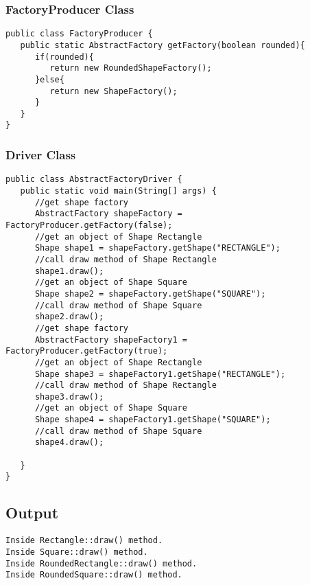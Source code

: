 \subsubsection{FactoryProducer Class}

\begin{verbatim}
public class FactoryProducer {
   public static AbstractFactory getFactory(boolean rounded){   
      if(rounded){
         return new RoundedShapeFactory();         
      }else{
         return new ShapeFactory();
      }
   }
}
\end{verbatim}

\subsubsection{Driver Class}

\begin{verbatim}
public class AbstractFactoryDriver {
   public static void main(String[] args) {
      //get shape factory
      AbstractFactory shapeFactory = FactoryProducer.getFactory(false);
      //get an object of Shape Rectangle
      Shape shape1 = shapeFactory.getShape("RECTANGLE");
      //call draw method of Shape Rectangle
      shape1.draw();
      //get an object of Shape Square 
      Shape shape2 = shapeFactory.getShape("SQUARE");
      //call draw method of Shape Square
      shape2.draw();
      //get shape factory
      AbstractFactory shapeFactory1 = FactoryProducer.getFactory(true);
      //get an object of Shape Rectangle
      Shape shape3 = shapeFactory1.getShape("RECTANGLE");
      //call draw method of Shape Rectangle
      shape3.draw();
      //get an object of Shape Square 
      Shape shape4 = shapeFactory1.getShape("SQUARE");
      //call draw method of Shape Square
      shape4.draw();
      
   }
}
\end{verbatim}

\subsection{Output}

\begin{verbatim}
Inside Rectangle::draw() method.
Inside Square::draw() method.
Inside RoundedRectangle::draw() method.
Inside RoundedSquare::draw() method.
\end{verbatim}